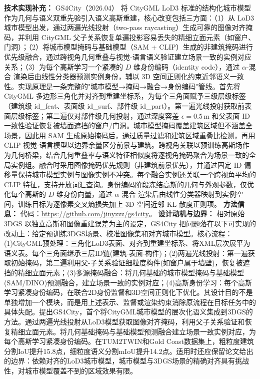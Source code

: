 \textbf{技术实现补充：} GS4City（2026.04） 将 CityGML LoD3 标准的结构化城市模型作为几何与语义双重先验引入语义高斯重建，核心改变包括三方面：（1）从 LoD3 城市模型出发，通过两遍光线投射（two-pass raycasting）生成可靠的图像对齐掩码，并利用 CityGML 父子关系恢复单遍投影容易丢失的精细立面元素（如窗户、门洞）；（2）将城市模型掩码与基础模型（SAM + CLIP）生成的非建筑掩码进行优先级融合，通过跨视角几何重叠与视觉-语言语义验证建立场景一致的实例对应关系；（3）为每个高斯学习一个紧凑的 $D$ 维身份编码（identity code），通过 $\alpha$-混合 渲染后由线性分类器预测实例身份，辅以 3D 空间正则化约束近邻语义一致性。实现原理是一条完整的"城市模型→掩码→融合→身份编码"管线。首先将 CityGML 多边形三角化并对齐到重建坐标系，为每个三角面赋予三级层级标签（建筑级 id\_feat、表面级 id\_surf、部件级 id\_part）。第一遍光线投射获取前表面层级标签；第二遍仅对部件级几何投射，通过深度容差 $\epsilon=0.5$\,m 和父表面 ID 一致性验证恢复被墙面遮挡的窗户/门洞。城市模型掩码覆盖建筑区域但不涵盖全场景，因此用 SAM 生成原始掩码后，通过质量过滤和建筑区域重叠比检测，再用 CLIP 视觉-语言模型以边界余量区分前景与建筑。跨视角关联以预训练高斯场作为几何桥梁，结合几何重叠率与语义特征相似度将逐视角掩码聚合为场景一致的全局实例组。融合时采用图像掩码优先规则（非建筑前景优先），并通过固定 ID 偏移量保持城市模型实例与图像实例不冲突。每个融合实例还关联一个跨视角平均的 CLIP 特征，支持开放词汇查询。身份编码阶段冻结高斯的几何与外观参数，仅优化每个高斯的 $D$ 维身份向量，通过 $\alpha$-混合 渲染后由线性分类器映射到实例空间，训练目标为逐像素交叉熵损失加上 3D 空间近邻 KL 散度正则项。
\textbf{方法信息：} 代码：\url{https://github.com/jinyzzz/gs4city}。
\textbf{设计动机与边界：} 相对原始 3DGS 以独立高斯和图像重建误差为主的设定，GS4City 把问题落在以下可实现的改动上：给定预训练3DGS场景、校准图像集和对齐城市模型。核心流程：(1)CityGML预处理：三角化LoD3表面、对齐到重建坐标系、将XML层次展平为语义表。每个三角面继承三层ID链(建筑-表面-构件)；(2)两遍光线投射：第一遍获取初始掩码，第二遍利用父-子关系验证细粒度构件(如窗户属于墙壁)，恢复被遮挡的精细立面元素；(3)多源掩码融合：将几何基础的城市模型掩码与基础模型(SAM/DINO)预测融合，建立场景一致的实例对应；(4)高斯身份学习：每个高斯学习紧凑身份编码，在联合2D身份监督和3D空间正则化下优化。其设计目的不是单独增加一个模块，而是用上述表示、监督或渲染约束消除原流程在目标任务中的具体失配。提出GS4City，首个将CityGML城市模型的层次化语义集成到3DGS的方法。通过两遍光线投射从LoD3模型获取图像对齐掩码，利用父子关系验证和恢复精细立面元素。将几何基础掩码与基础模型预测融合建立场景一致实例对应，为每个高斯学习紧凑身份编码。在TUM2TWIN和Gold Coast数据集上，粗粒度建筑分割IoU提升15.8点，细粒度语义分割mIoU提升14.2点。适用时还应保留论文给出的边界：依赖对齐的LoD3城市模型，城市模型与3DGS场景的精确对齐具有挑战性，对城市模型覆盖不到的区域效果有限。


